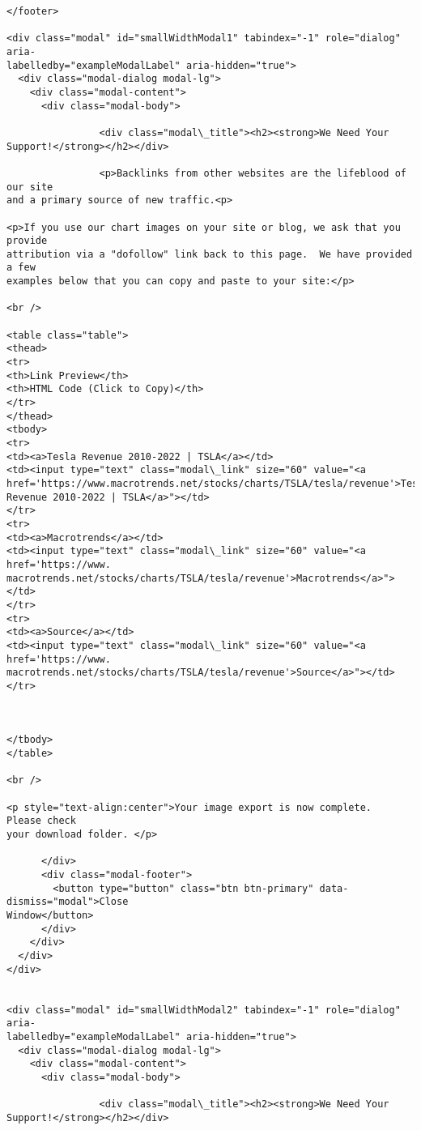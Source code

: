 \documentclass[11pt]{article}
\begin{document}
\begin{Verbatim}[commandchars=\\\{\}]
</footer>

<div class="modal" id="smallWidthModal1" tabindex="-1" role="dialog" aria-
labelledby="exampleModalLabel" aria-hidden="true">
  <div class="modal-dialog modal-lg">
    <div class="modal-content">
      <div class="modal-body">

                <div class="modal\_title"><h2><strong>We Need Your
Support!</strong></h2></div>

                <p>Backlinks from other websites are the lifeblood of our site
and a primary source of new traffic.<p>

<p>If you use our chart images on your site or blog, we ask that you provide
attribution via a "dofollow" link back to this page.  We have provided a few
examples below that you can copy and paste to your site:</p>

<br />

<table class="table">
<thead>
<tr>
<th>Link Preview</th>
<th>HTML Code (Click to Copy)</th>
</tr>
</thead>
<tbody>
<tr>
<td><a>Tesla Revenue 2010-2022 | TSLA</a></td>
<td><input type="text" class="modal\_link" size="60" value="<a
href='https://www.macrotrends.net/stocks/charts/TSLA/tesla/revenue'>Tesla
Revenue 2010-2022 | TSLA</a>"></td>
</tr>
<tr>
<td><a>Macrotrends</a></td>
<td><input type="text" class="modal\_link" size="60" value="<a href='https://www.
macrotrends.net/stocks/charts/TSLA/tesla/revenue'>Macrotrends</a>"></td>
</tr>
<tr>
<td><a>Source</a></td>
<td><input type="text" class="modal\_link" size="60" value="<a href='https://www.
macrotrends.net/stocks/charts/TSLA/tesla/revenue'>Source</a>"></td>
</tr>



</tbody>
</table>

<br />

<p style="text-align:center">Your image export is now complete.  Please check
your download folder. </p>

      </div>
      <div class="modal-footer">
        <button type="button" class="btn btn-primary" data-dismiss="modal">Close
Window</button>
      </div>
    </div>
  </div>
</div>


<div class="modal" id="smallWidthModal2" tabindex="-1" role="dialog" aria-
labelledby="exampleModalLabel" aria-hidden="true">
  <div class="modal-dialog modal-lg">
    <div class="modal-content">
      <div class="modal-body">

                <div class="modal\_title"><h2><strong>We Need Your
Support!</strong></h2></div>


\end{Verbatim}
\end{document}

